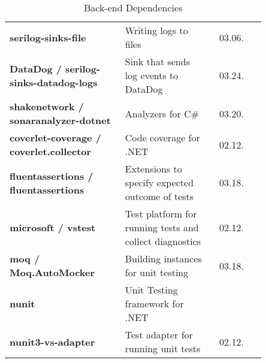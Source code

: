 \begin{table}[h!]
{\begin{tabular}{ p{0.45\linewidth} p{0.35\linewidth} r p{0.05\linewidth} }
          \addlinespace
          
          \textbf{serilog-sinks-file} & Writing logs to files & 03.06. \\
          
          \addlinespace[0.2cm]
          \midrule
          \addlinespace[0.2cm]
          
          \textbf{DataDog / serilog-sinks-datadog-logs} & Sink that sends log events to DataDog & 03.24. \\
          
          \addlinespace[0.2cm]
          \midrule
          \addlinespace[0.2cm]
          
          \textbf{shakenetwork / sonaranalyzer-dotnet} & Analyzers for C\# & 03.20. \\
          
          \addlinespace[0.2cm]
          \midrule
          \addlinespace[0.2cm]
          
          \textbf{coverlet-coverage / coverlet.collector} & Code coverage for .NET & 02.12. \\
          
          \addlinespace[0.2cm]
          \midrule
          \addlinespace[0.2cm]
          
          \textbf{fluentassertions / fluentassertions} & Extensions to specify expected outcome of tests & 03.18. \\
          
          \addlinespace[0.2cm]
          \midrule
          \addlinespace[0.2cm]
          
          \textbf{microsoft / vstest} & Test platform for running tests and collect diagnostics & 02.12. \\
          
          \addlinespace[0.2cm]
          \midrule
          \addlinespace[0.2cm]
          
          \textbf{moq / Moq.AutoMocker} & Building instances for unit testing & 03.18. \\
          
          \addlinespace[0.2cm]
          \midrule
          \addlinespace[0.2cm]
          
          \textbf{nunit} & Unit Testing framework for .NET \\
          
          \addlinespace[0.2cm]
          
          \textbf{nunit3-vs-adapter} & Test adapter for running unit tests & 02.12. \\
          
          \bottomrule
        \end{tabular}
    }
    
    \caption{Back-end Dependencies}
    \label{fig:backendDependencyTable}
\end{table}

